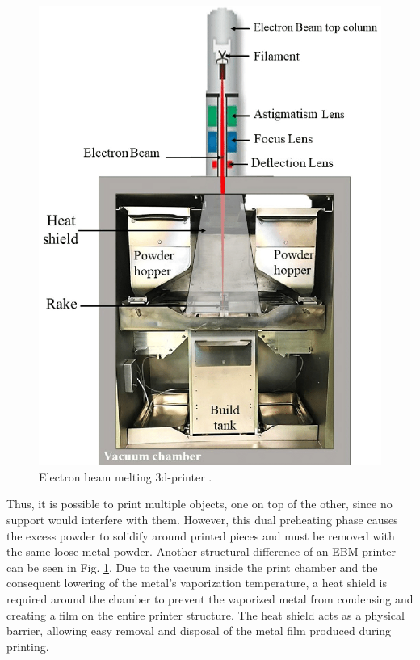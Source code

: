 \begin{figure}[H]
    \centering
    \includegraphics[scale=0.25]{Images/A-schematic-of-electron-beam-melting-EBM.png}
    \caption[EBM 3d-printer.]{Electron beam melting 3d-printer \cite{azam_-depth_2018}.}
    \label{fig:ebm_printer}
\end{figure} 
Thus, it is possible to print multiple objects, one on top of the other, since no support would interfere with them. However, this dual preheating phase causes the excess powder to solidify around printed pieces and must be removed with the same loose metal powder. Another structural difference of an EBM printer can be seen in Fig. \ref{fig:ebm_printer}. Due to the vacuum inside the print chamber and the consequent lowering of the metal's vaporization temperature, a heat shield is required around the chamber to prevent the vaporized metal from condensing and creating a film on the entire printer structure. The heat shield acts as a physical barrier, allowing easy removal and disposal of the metal film produced during printing.

